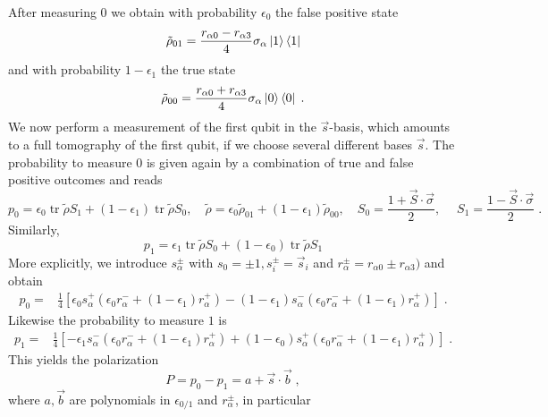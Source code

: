 \documentclass[two column]{article}
\begin{document}
After measuring $0$ we obtain with probability $\epsilon_0$  the false positive state
\begin{equation}
	\tilde \rho_{01}=\frac{r_{\alpha0}-r_{\alpha3}}{4} \sigma_\alpha \ket{1}\bra{1}
\end{equation}
and with probability $1-\epsilon_1$ the true state
\begin{equation}
	\tilde \rho_{00}=\frac{r_{\alpha0}+r_{\alpha3}}{4} \sigma_\alpha \ket{0}\bra{0}\;.
\end{equation}
We now perform a measurement of the first qubit in the $\vec s$-basis, which amounts to a full tomography of the first qubit, if we choose several different bases $\vec s$. The probability to measure $0$ is given again by a combination of true and false positive outcomes and reads
\begin{equation}
	p_0=\epsilon_0 \operatorname{tr} \tilde \rho S_1  +(1-\epsilon_1) \operatorname{tr} \tilde \rho S_0  , \quad \tilde \rho=\epsilon_0 \tilde \rho_{01}+(1-\epsilon_1) \tilde \rho_{00} , \quad S_0=\frac{1+\vec S \cdot \vec \sigma}{2}, \;\quad S_1=\frac{1-\vec S \cdot \vec \sigma}{2}\;.
	\end{equation} 
	Similarly,
	\begin{equation}
		p_1=\epsilon_1 \operatorname{tr} \tilde \rho S_0 + (1-\epsilon_0)\operatorname{tr} \tilde \rho S_1
	\end{equation}
	More explicitly, we introduce $s^\pm_\alpha$ with $s_0=\pm 1, s^\pm_i=\vec s_i$ and $r_\alpha^\pm=r_{\alpha0}\pm r_{\alpha 3})$ and obtain
\begin{equation}
\begin{aligned}
p_0=&	\frac{1}{4} [\epsilon_0s^+_\alpha (\epsilon_0r^-_{\alpha}+(1-\epsilon_1)r^+_{\alpha})  
-(1-\epsilon_1) s^-_\alpha(\epsilon_0r^-_{\alpha}+(1-\epsilon_1)r^+_{\alpha})  ]\;.
\end{aligned}
\end{equation}
Likewise the probability to measure $1$ is
\begin{equation}
\begin{aligned}
p_1=&	\frac{1}{4} [-\epsilon_1 s^-_\alpha(\epsilon_0r^-_{\alpha}+(1-\epsilon_1)r^+_{\alpha})
+(1-\epsilon_0) s^+_\alpha (\epsilon_0r^-_{\alpha}+(1-\epsilon_1)r^+_{\alpha})   ]\;.
\end{aligned}
\end{equation}
This yields the polarization 
\begin{equation}
	P=p_0-p_1= a+ \vec s \cdot \vec b \;,
\end{equation}
where $a,\vec b$ are polynomials in $\epsilon_{0/1}$ and $r_\alpha^\pm$, in particular
\end{document}
